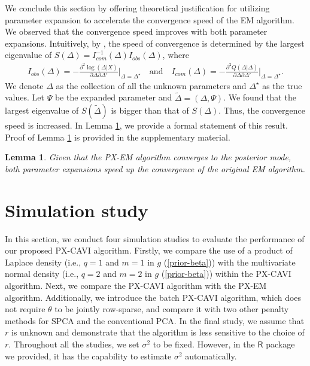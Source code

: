 \documentclass[pdftex, noinfoline, letter]{imsart}
\theoremstyle{plain}
\newtheorem{lemma}[theorem]{Lemma}
\begin{document}
We conclude this section by offering theoretical justification for utilizing parameter expansion to accelerate the convergence speed of the EM algorithm. We observed that the convergence speed improves with both parameter expansions.
Intuitively, by \citet{dempster77}, the speed of convergence is determined by the largest eigenvalue of $S(\Delta) = I^{-1}_{com}(\Delta) I_{obs}(\Delta)$, where
\begin{align}
\label{info-mtx}
I_{obs}(\Delta) = -\frac{\partial^2 \log(\Delta|X)}{\partial \Delta \partial \Delta'}\Bigg|_{\Delta = \Delta^\star}
\quad\text{and}\quad
I_{com}(\Delta) = -\frac{\partial^2 Q(\Delta|\Delta)}{\partial \Delta \partial \Delta'}\Bigg|_{\Delta = \Delta^\star}.
\end{align}
We denote $\Delta$ as the collection of all the unknown parameters and $\Delta^\star$ as the true values.
Let $\Psi$ be the expanded parameter and $\widetilde  \Delta = (\Delta, \Psi)$.  We found that the largest eigenvalue of $S(\widetilde  \Delta)$ is bigger than that of $S(\Delta)$. Thus, the convergence speed is increased. In Lemma \ref{lemma-convergence-EM}, we provide a formal statement of this result. Proof of Lemma \ref{lemma-convergence-EM} is provided in the supplementary material. 
\begin{lemma}
\label{lemma-convergence-EM}
Given that the PX-EM algorithm converges to the posterior mode, both parameter expansions speed up the convergence of the original EM algorithm.
\end{lemma}


\section{Simulation study}
\label{sec:simstudy}

In this section, we conduct four simulation studies to evaluate the performance of our proposed PX-CAVI algorithm. Firstly, we compare the use of a product of Laplace density (i.e., $q = 1$ and $m=1$ in $g$ (\ref{prior-beta})) with the multivariate normal density (i.e., $q = 2$ and $m = 2$ in $g$ (\ref{prior-beta})) within the PX-CAVI algorithm. Next, we compare the PX-CAVI algorithm with the PX-EM algorithm. Additionally, we introduce the batch PX-CAVI algorithm, which does not require $\theta$ to be jointly row-sparse, and compare it with two other penalty methods for SPCA and the conventional PCA.
In the final study, we assume that $r$ is unknown and demonstrate that the algorithm is less sensitive to the choice of $r$.
Throughout all the studies, we set $\sigma^2$ to be fixed. However, in the $\mathsf{R}$ package we provided, it has the capability to estimate $\sigma^2$ automatically.
\end{document}

